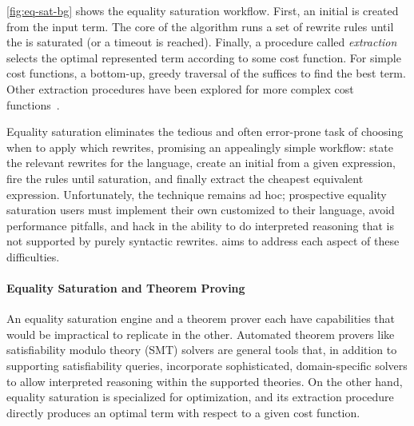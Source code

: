 \autoref{fig:eq-sat-bg} shows the equality saturation workflow.
First, an initial \egraph is created from the input term.
The core of the algorithm runs a set of rewrite rules until the \egraph is
  saturated (or a timeout is reached).
Finally, a procedure called \textit{extraction} selects the optimal represented
  term according to some cost function.
For simple cost functions, a bottom-up, greedy traversal of the \egraph suffices
  to find the best term.
Other extraction procedures have been explored for more complex cost
  functions~\cite{spores, wu_siga19}.

Equality saturation eliminates the tedious and often error-prone
  task of choosing when to apply which rewrites,
  promising an appealingly simple workflow: state the
  relevant rewrites for the language, create an initial \egraph from a given
  expression, fire the rules until saturation,
  and finally extract the cheapest equivalent expression.
Unfortunately, the technique remains ad hoc; prospective equality saturation
  users must implement their own \egraphs customized to their language, avoid
  performance pitfalls, and hack in the ability to do interpreted reasoning
  that is not supported by purely syntactic rewrites.
\egg aims to address each aspect of these difficulties.

\paragraph{Equality Saturation and Theorem Proving}
An equality saturation engine and a theorem prover each have capabilities that
  would be impractical to replicate in the other.
Automated theorem provers like satisfiability modulo theory (SMT) solvers are
  general tools that, in addition to supporting satisfiability queries,
  incorporate sophisticated, domain-specific solvers to allow interpreted
  reasoning within the supported theories.
On the other hand, equality saturation is specialized for optimization, and its
  extraction procedure directly produces an optimal term with respect to a given
  cost function.


